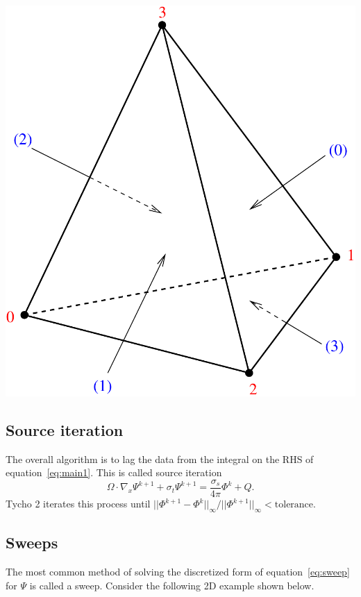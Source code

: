 \documentclass[12pt,letterpaper]{article}
\begin{document}
\includegraphics[scale=0.5]{tet-eps-converted-to.pdf}





\subsection{Source iteration}
The overall algorithm is to lag the data from the integral on the RHS of equation~\eqref{eq:main1}.
This is called source iteration
\begin{equation}
\Omega \cdot \nabla_x \Psi^{k+1} + \sigma_t \Psi^{k+1} = \frac{\sigma_s}{4\pi} \Phi^k + Q.
\end{equation}
Tycho 2 iterates this process until $||\Phi^{k+1} - \Phi^k||_\infty / ||\Phi^{k+1}||_\infty < \textrm{tolerance}$.



\subsection{Sweeps}
The most common method of solving the discretized form of equation~\eqref{eq:sweep} for $\Psi$ is called a sweep.
Consider the following 2D example shown below.
\end{document}
